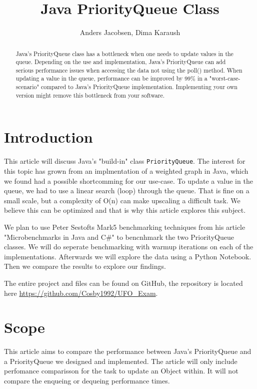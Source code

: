 \documentclass{article}
\title{Java PriorityQueue Class}
\author{Anders Jacobsen, Dima Karaush}
\begin{document}
\maketitle

\begin{abstract}
    Java's PriorityQueue class has a bottleneck when one needs to update values in the queue.
    Depending on the use and implementation, Java's PriorityQueue can add serious performance 
    issues when accessing the data not using the poll() method.
    When updating a value in the queue, performance can be improved by 99\% in a "worst-case-scenario" compared 
    to Java's PriorityQueue implementation. Implementing your own version might remove this 
    bottleneck from your software. 
\end{abstract}

\section{Introduction}
This article will discuss Java's "build-in" class \lstinline!PriorityQueue!. 
The interest for this topic has grown from an implmentation of a weighted graph 
in Java, which we found had a possible shortcomming for our use-case. To update
a value in the queue, we had to use a linear search (loop) through the queue. 
That is fine on a small scale, but a complexity of O(n) can make upscaling a difficult task. 
We believe this can be optimized and that is why this article explores this subject.  

We plan to use Peter Sestofts Mark5 benchmarking techniques from his article 
"Microbenchmarks in Java and C\#" \cite{microbenchmarks} to bencnhmark the two 
PriorityQueue classes. We will do seperate benchmarking with warmup iterations on 
each of the implementations. Afterwards we will explore the data using a Python
Notebook. Then we compare the results to explore our findings. 

The entire project and files can be found on GitHub, the repository is located here 
\url{https://github.com/Cosby1992/UFO_Exam}.


\section{Scope}
This article aims to compare the performance between Java's PriorityQueue
and a PriorityQueue we designed and implemented. The article will only include 
perfomance comparisson for the task to update an Object within. It will not 
compare the enqueing or dequeing performance times.
\end{document}
